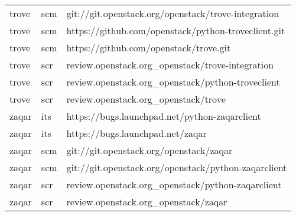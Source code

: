 \begin{center}
\begin{longtable}{|p{4cm}|p{1cm}|p{10cm}|}
trove&scm&git://git.openstack.org/openstack/trove-integration\\ 
trove&scm&https://github.com/openstack/python-troveclient.git\\ 
trove&scm&https://github.com/openstack/trove.git\\ 
trove&scr&review.openstack.org\_openstack/trove-integration\\ 
trove&scr&review.openstack.org\_openstack/python-troveclient\\ 
trove&scr&review.openstack.org\_openstack/trove\\ 
zaqar&its&https://bugs.launchpad.net/python-zaqarclient\\ 
zaqar&its&https://bugs.launchpad.net/zaqar\\ 
zaqar&scm&git://git.openstack.org/openstack/zaqar\\ 
zaqar&scm&git://git.openstack.org/openstack/python-zaqarclient\\ 
zaqar&scr&review.openstack.org\_openstack/python-zaqarclient\\ 
zaqar&scr&review.openstack.org\_openstack/zaqar \\
\hline
\end{longtable}
\end{center}

 
